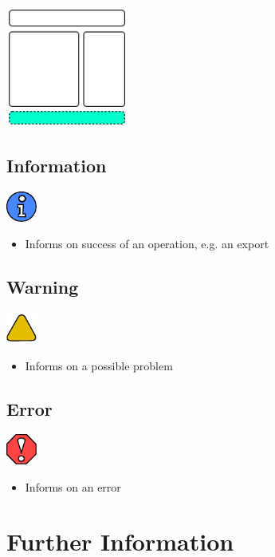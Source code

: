 \includegraphics[height=4cm]{main_window_sketch_4.png}

\subsection{Information}

\includegraphics[width=1cm]{../../gui/source/resources/message_info.pdf}
\begin{itemize}
\item Informs on success of an operation, e.g. an export
\end{itemize}

\subsection{Warning}

\includegraphics[width=1cm]{../../gui/source/resources/message_warn.pdf}
\begin{itemize}
\item Informs on a possible problem
\end{itemize}

\subsection{Error}

\includegraphics[width=1cm]{../../gui/source/resources/message_error.pdf}
\begin{itemize}
\item Informs on an error
\end{itemize}

\section{Further Information}


